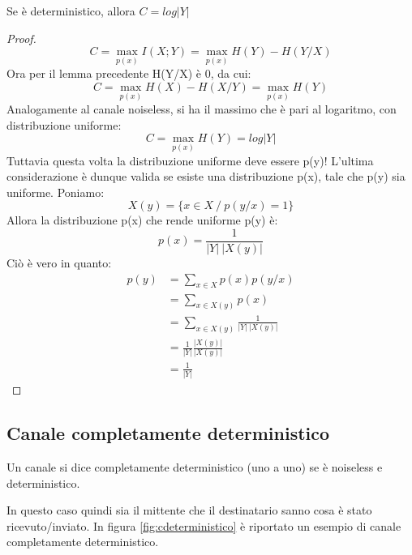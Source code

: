 \begin{lemma}
Se  è deterministico, allora $C=log|Y|$
\begin{proof}
 \[
  C=\max_{p(x)} I(X;Y)=\max_{p(x)} H(Y)-H(Y/X)
 \]
 Ora per il lemma precedente H(Y/X) è 0, da cui:
 \[
  C=\max_{p(x)} H(X)-H(X/Y)=\max_{p(x)} H(Y)
 \]
 Analogamente al canale noiseless, si ha il massimo che è pari al logaritmo, con distribuzione uniforme:
 \[
  C=\max_{p(x)} H(Y)=log|Y|
 \]
 Tuttavia questa volta la distribuzione uniforme deve essere p(y)!
 L'ultima considerazione è dunque valida se esiste una distribuzione p(x), tale che p(y) sia uniforme.
 Poniamo:
 \[
  X(y)=\{x \in X \ / \ p(y/x)=1 \}
 \]
 Allora la distribuzione p(x) che rende uniforme p(y) è:
 \[
  p(x)=\frac{1}{|Y| \ |X(y)|}
 \]
 Ciò è vero in quanto:
 \[\begin{split}
  p(y)&=\sum_{x \in X}p(x)p(y/x) \\
      &=\sum_{x \in X(y)}p(x) \\
      &=\sum_{x \in X(y)}\frac{1}{|Y| \ |X(y)|} \\
      &=\frac{1}{|Y|} \frac{|X(y)|}{|X(y)|} \\
      &=\frac{1}{|Y|}
   \end{split}
 \]

\end{proof}
\end{lemma}


\subsection{Canale completamente deterministico}

\medskip

\begin{definizione}
 Un canale si dice completamente deterministico (uno a uno) se è noiseless e deterministico.
\end{definizione}

In questo caso quindi sia il mittente che il destinatario sanno cosa è stato ricevuto/inviato.
In figura \ref{fig:cdeterministico} è riportato un esempio di canale completamente deterministico.

